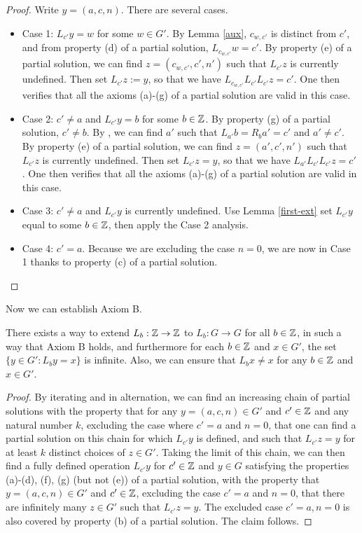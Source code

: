 \begin{proof} Write $y = (a,c,n)$. There are several cases.
  \begin{itemize}
    \item Case 1: $L_{c'} y = w$ for some $w \in G'$.  By Lemma \ref{aux}, $c_{w,c'}$ is distinct from $c'$, and from property (d) of a partial solution, $L_{c_{w,c'}} w = c'$.  By property (e) of a partial solution, we can find $z = (c_{w,c'}, c', n')$ such that $L_{c'} z$ is currently undefined.  Then set $L_{c'} z := y$, so that we have $L_{c_{w,c'}} L_{c'} L_{c'} z = c'$.  One then verifies that all the axioms (a)-(g) of a partial solution are valid in this case.
    \item Case 2: $c' \neq a$ and $L_{c'} y = b$ for some $b \in \mathbb{Z}$. By property (g) of a partial solution, $c' \neq b$.  By , we can find $a'$ such that $L_{a'} b = R_b a' = c'$ and $a' \neq c'$.  By property (e) of a partial solution, we can find $z = (a', c', n')$ such that $L_{c'} z$ is currently undefined.  Then set $L_{c'} z = y$, so that we have $L_{a'} L_{c'} L_{c'} z = c'$. One then verifies that all the axioms (a)-(g) of a partial solution are valid in this case.
    \item Case 3: $c' \neq a$ and $L_{c'} y$ is currently undefined.  Use Lemma \ref{first-ext} set $L_{c'} y$ equal to some $b \in \mathbb{Z}$, then apply the Case 2 analysis.
    \item Case 4: $c' = a$.  Because we are excluding the case $n=0$, we are now in Case 1 thanks to property (c) of a partial solution.
  \end{itemize}
\end{proof}


Now we can establish Axiom B.

\begin{proposition}\label{axiom-b}  There exists a way to extend $L_b: \mathbb{Z} \to \mathbb{Z}$ to $L_b: G \to G$ for all $b \in \mathbb{Z}$, in such a way that Axiom B holds, and furthermore for each $b \in \mathbb{Z}$ and $x \in G'$, the set $\{ y \in G': L_b y = x \}$ is infinite. Also, we can ensure that $L_b x \neq x$ for any $b \in \mathbb{Z}$ and $x \in G'$.
\end{proposition}

\begin{proof}
By iterating  and  in alternation, we can find an increasing chain of partial solutions with the property that for any $y = (a,c,n) \in G'$ and $c' \in \mathbb{Z}$ and any natural number $k$, excluding the case where $c'=a$ and $n=0$, that one can find a partial solution on this chain for which $L_{c'} y$ is defined, and such that $L_{c'} z = y$ for at least $k$ distinct choices of $z \in G'$.  Taking the limit of this chain, we can then find a fully defined operation $L_{c'} y$ for $c' \in \mathbb{Z}$ and $y \in G$ satisfying the properties (a)-(d), (f), (g) (but not (e)) of a partial solution, with the property that
$y = (a,c,n) \in G'$ and $c' \in \mathbb{Z}$, excluding the case $c'=a$ and $n=0$, that there are infinitely many $z \in G'$ such that $L_{c'} z = y$.  The excluded case $c'=a, n=0$ is also covered by property (b) of a partial solution.  The claim follows.
\end{proof}

